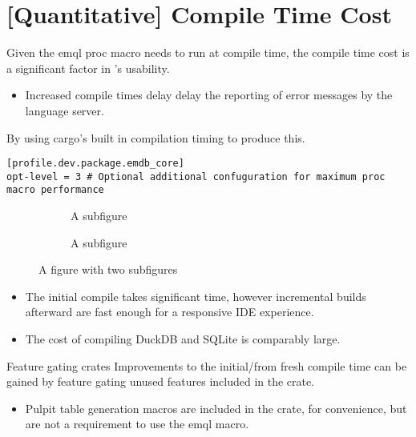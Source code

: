 \section{[Quantitative] Compile Time Cost}
Given the emql proc macro needs to run at compile time, the compile time cost is a significant factor in \emdb's usability.
\begin{itemize}
    \setlength\itemsep{0em}
    \item Increased compile times delay delay the reporting of error messages by the language server.
\end{itemize}
By using cargo's built in compilation timing to produce this.
\begin{verbatim}
[profile.dev.package.emdb_core]
opt-level = 3 # Optional additional confuguration for maximum proc macro performance
\end{verbatim}
\noindent
\begin{figure}
    \centering
    \begin{subfigure}
      \centering
      \caption{A subfigure}
      \label{fig:sub1}
    \end{subfigure}%
    \begin{subfigure}
      \centering
      \caption{A subfigure}
      \label{fig:sub2}
    \end{subfigure}
    \caption{A figure with two subfigures}
    \label{fig:test}
\end{figure}
\begin{itemize}
    \setlength\itemsep{0em}
    \item The initial compile takes significant time, however incremental builds afterward are fast enough for a responsive IDE experience.
    \item The cost of compiling DuckDB and SQLite is comparably large.
\end{itemize}
\begin{futurebox}{Feature gating crates}
    Improvements to the initial/from fresh compile time can be gained by feature gating unused features included in the \emdb crate.
    \begin{itemize}
        \item Pulpit table generation macros are included in the \emdb crate, for convenience, but are not a requirement to use the emql macro.
    \end{itemize}
\end{futurebox}
